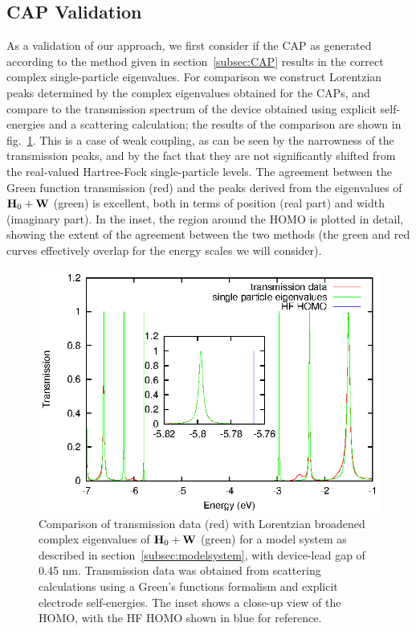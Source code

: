 \subsection{\ac{CAP} Validation}
\label{subsec:SingleParticle}

As a validation of our approach, we first consider if
the \ac{CAP} as generated according to the method given in
section~\ref{subsec:CAP} results in the correct complex single-particle
eigenvalues.
For comparison we construct Lorentzian peaks determined by the complex
eigenvalues obtained for the \acp{CAP}, and compare to the transmission
spectrum of the device obtained using explicit self-energies and a scattering
calculation; the results of the comparison are shown in fig.~\ref{fig:13evals}.
This is a case of weak coupling, as can be seen by the narrowness of the
transmission peaks, and by the fact that they are not significantly shifted
from the real-valued Hartree-Fock single-particle levels. %
The agreement between the Green function transmission (red) and the peaks
derived from the eigenvalues of $\mathbf{H}_0 + \mathbf{W}$ (green) is excellent,
both in terms of position (real part) and width (imaginary part). In the inset,
the region around the \ac{HOMO} is plotted in detail, showing the extent of
the agreement between the two methods (the green and red curves effectively
overlap for the energy scales we will consider).

\begin{figure} 
	\begin{center}
		\includegraphics[width=0.9\linewidth]{figures/13evals}
	\end{center}
	\caption{Comparison of transmission data (red) with Lorentzian
	broadened complex eigenvalues of $\mathbf{H}_0 + \mathbf{W}$ (green) for a
	model system as described in section~\ref{subsec:modelsystem}, with
	device-lead gap of 0.45 nm. Transmission data was obtained from
	scattering calculations using a Green's functions formalism and
	explicit electrode self-energies.
	The inset shows a close-up view of the \ac{HOMO}, with the HF \ac{HOMO}
	shown in blue for reference.
	}
	\label{fig:13evals}
\end{figure}


